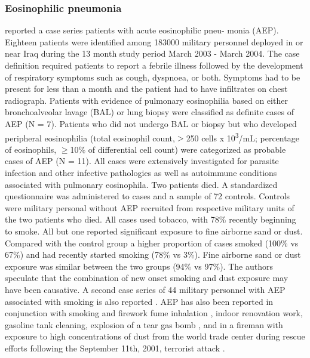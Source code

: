 \documentclass[a4paper,12pt]{article}
\begin{document}
\subsubsection{Eosinophilic pneumonia}
\cite{Shorr2004}  reported a case series patients with acute eosinophilic pneu- monia (AEP). Eighteen patients were identified among 183000 military personnel deployed in or near Iraq during the 13 month study period March 2003 - March 2004. The case definition required patients to report a febrile illness followed by the development of respiratory symptoms such as cough, dyspnoea, or both. Symptoms had to be present for less than a month and the patient had to have infiltrates on chest radiograph. Patients with evidence of pulmonary eosinophilia based on either bronchoalveolar lavage (BAL) or lung biopsy were classified as definite cases of AEP (N = 7).  Patients who did not undergo BAL or biopsy but who developed peripheral eosinophilia (total eosinophil count,\ensuremath{>}250 cells x 10\textsuperscript{3}/mL; percentage of eosinophils,  \ensuremath{\geq}10\% of differential cell count) were categorized as probable cases of AEP (N = 11). All cases were extensively investigated for parasite infection and other infective pathologies as well as autoimmune conditions associated with pulmonary eosinophila. Two patients died. A standardized questionnaire was administered to cases and a sample of 72 controls. Controls were military personal without AEP recruited from respective military units of the two patients who died. All cases used tobacco, with 78\% recently beginning to smoke. All but one reported significant exposure to fine airborne sand or dust. Compared with the control group a higher proportion of cases smoked (100\% vs 67\%) and had recently started smoking (78\% vs 3\%). Fine airborne sand or dust exposure was similar between the two groups (94\% vs 97\%). The authors speculate that the combination of new onset smoking and dust exposure may have been causative. A second case series of 44 military personnel with AEP associated with smoking is also reported \cite{Sine2011}. AEP has also been reported in conjunction with smoking and firework fume inhalation \cite{Hirai2000}, indoor renovation work, gasoline tank cleaning, explosion of a tear gas bomb \cite{Philit2002}, and in a fireman with exposure to high concentrations of dust from the world trade center during rescue efforts following the September 11th, 2001, terrorist attack \cite{Rom2002}.
\end{document}
